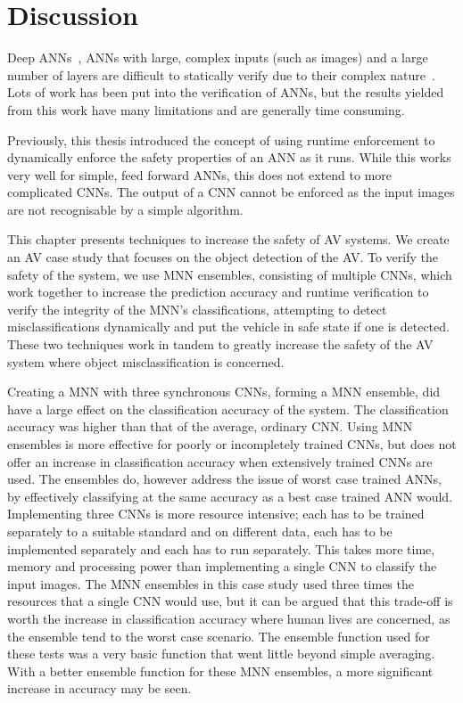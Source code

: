 \section{Discussion}
Deep \acfp{ANN}~\cite{schmidhuber2015deep}, \acp{ANN} with large, complex inputs (such as images) and a large number of layers are difficult to statically verify due to their complex nature~\cite{Gehr2018AI2SA}. 
Lots of work has been put into the verification of \acp{ANN}, but the results yielded from this work have many limitations and are generally time consuming.

Previously, this thesis introduced the concept of using runtime enforcement to dynamically enforce the safety properties of an \ac{ANN} as it runs. 
While this works very well for simple, feed forward \acp{ANN}, this does not extend to more complicated \acp{CNN}.
The output of a \ac{CNN} cannot be enforced as the input images are not recognisable by a simple algorithm.

This chapter presents techniques to increase the safety of \ac{AV} systems. 
We create an \acf{AV} case study that focuses on the object detection of the \ac{AV}. 
To verify the safety of the system, we use \ac{MNN} ensembles, consisting of multiple \acp{CNN}, which work together to increase the prediction accuracy and runtime verification to verify the integrity of the \ac{MNN}'s classifications, attempting to detect misclassifications dynamically and put the vehicle in safe state if one is detected.
These two techniques work in tandem to greatly increase the safety of the \ac{AV} system where object misclassification is concerned.

Creating a \ac{MNN}  with three synchronous \acp{CNN}, forming a \ac{MNN} ensemble, did have a large effect on the classification accuracy of the system.
The classification accuracy was higher than that of the average, ordinary \ac{CNN}.
Using \ac{MNN} ensembles is more effective for poorly or incompletely trained \acp{CNN}, but does not offer an increase in classification accuracy when extensively trained \acp{CNN} are used.
The ensembles do, however address the issue of worst case trained \acp{ANN}, by effectively classifying at the same accuracy as a best case trained \ac{ANN} would.
Implementing three \acp{CNN} is more resource intensive; each has to be trained separately to a suitable standard and on different data, each has to be implemented separately and each has to run separately.
This takes more time, memory and processing power than implementing a single \ac{CNN} to classify the input images.
The \ac{MNN} ensembles in this case study used three times the resources that a single \ac{CNN} would use, but it can be argued that this trade-off is worth the increase in classification accuracy where human lives are concerned, as the ensemble tend to the worst case scenario.
The ensemble function used for these tests was a very basic function that went little beyond simple averaging.
With a better ensemble function for these \ac{MNN} ensembles, a more significant increase in accuracy may be seen.

